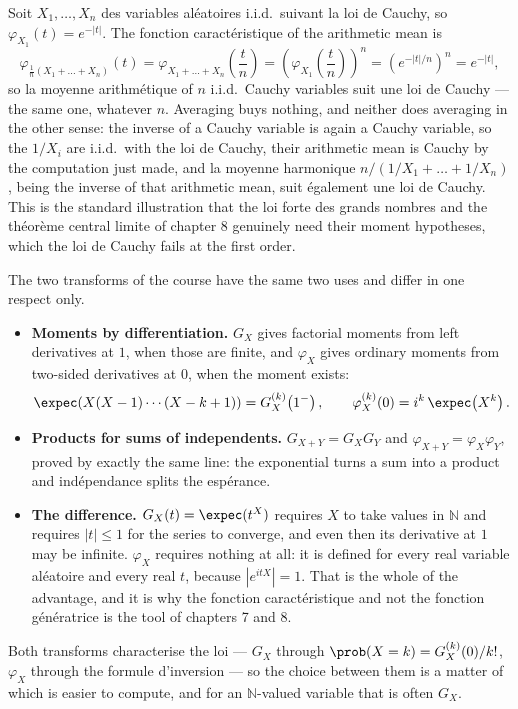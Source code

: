 \begin{example}
Soit $X_{1},\dots,X_{n}$ des variables aléatoires i.i.d.\ suivant la loi de Cauchy, so
$\varphi_{X_{1}}(t) = e^{-|t|}$. The fonction caractéristique of the arithmetic mean is
\[
  \varphi_{\frac{1}{n}(X_{1}+\dots+X_{n})}(t) =
  \varphi_{X_{1}+\dots+X_{n}}\!\left(\frac{t}{n}\right) =
  \left(\varphi_{X_{1}}\!\left(\frac{t}{n}\right)\right)^{n} = \left(e^{-|t|/n}\right)^{n} =
  e^{-|t|},
\]
so la moyenne arithmétique of $n$ i.i.d.\ Cauchy variables suit une loi de Cauchy --- the same
one, whatever $n$.
Averaging buys nothing, and neither does averaging in the other sense: the inverse of a
Cauchy variable is again a Cauchy variable, so the $1/X_{i}$ are i.i.d.\ with the loi de
Cauchy, their arithmetic mean is Cauchy by the computation just made, and la moyenne
harmonique $n/(1/X_{1}+\dots+1/X_{n})$, being the inverse of that arithmetic mean, suit
également une loi de Cauchy. This
is the standard illustration that the loi forte des grands nombres and
the théorème central limite of chapter 8 genuinely need their moment hypotheses, which the
loi de Cauchy fails at the first order.
\end{example}

\begin{remark}
The two transforms of the course have the same two uses and differ in one respect only.
\begin{itemize}
  \item \textbf{Moments by differentiation.} $G_{X}$ gives factorial moments
    from left derivatives at $1$, when those are finite, and $\varphi_{X}$ gives ordinary
    moments from two-sided derivatives at $0$, when the moment exists:
    \[
      \expec\!\left(X(X-1)\cdots(X-k+1)\right) = G_{X}^{(k)}\!\left(1^{-}\right), \qquad
      \varphi_{X}^{(k)}(0) = i^{k}\,\expec\!\left(X^{k}\right).
    \]
  \item \textbf{Products for sums of independents.} $G_{X+Y} = G_{X}G_{Y}$ and
    $\varphi_{X+Y} = \varphi_{X}\varphi_{Y}$, proved by exactly the same line: the
    exponential turns a sum into a product and indépendance splits the espérance.
  \item \textbf{The difference.} $G_{X}(t) = \expec(t^{X})$ requires $X$ to
    take values in $\mathbb{N}$ and requires $|t| \leq 1$ for the series to converge, and
    even then its derivative at $1$ may be infinite. $\varphi_{X}$ requires nothing at all:
    it is defined for every real variable aléatoire and every real $t$, because
    $\left|e^{itX}\right| = 1$. That is the whole of the advantage, and it is why the
    fonction caractéristique and not the fonction génératrice is the tool of chapters 7 and 8.
\end{itemize}
Both transforms characterise the loi --- $G_{X}$ through $\prob(X = k) = G_{X}^{(k)}(0)/k!$,
$\varphi_{X}$ through the formule d'inversion --- so the choice between them is a matter of
which is easier to compute, and for an $\mathbb{N}$-valued variable that is often $G_{X}$.
\end{remark}


